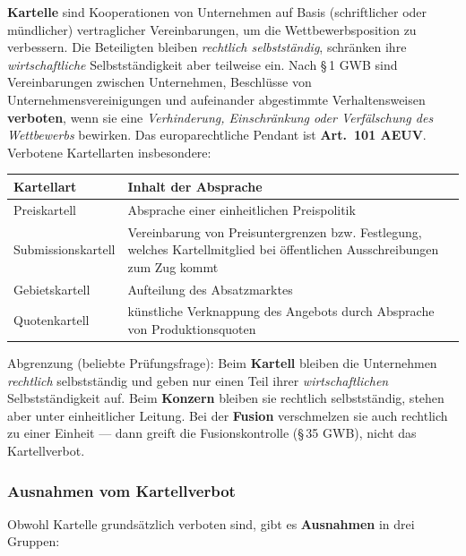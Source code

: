 \documentclass[11pt, a4paper]{article}
\begin{document}
\textbf{Kartelle} sind Kooperationen von Unternehmen auf Basis (schriftlicher oder
mündlicher) vertraglicher Vereinbarungen, um die Wettbewerbsposition zu verbessern. Die
Beteiligten bleiben \emph{rechtlich selbstständig}, schränken ihre \emph{wirtschaftliche}
Selbstständigkeit aber teilweise ein. Nach \S\,1 GWB sind Vereinbarungen zwischen
Unternehmen, Beschlüsse von Unternehmensvereinigungen und aufeinander abgestimmte
Verhaltensweisen \textbf{verboten}, wenn sie eine \emph{Verhinderung, Einschränkung oder
Verfälschung des Wettbewerbs} bewirken. Das europarechtliche Pendant ist
\textbf{Art.~101 AEUV}. Verbotene Kartellarten insbesondere:

\begin{center}
\begin{tabular}{p{4.2cm} p{9.8cm}}
\toprule
\textbf{Kartellart} & \textbf{Inhalt der Absprache}\\
\midrule
Preiskartell & Absprache einer einheitlichen Preispolitik\\
Submissionskartell & Vereinbarung von Preisuntergrenzen bzw. Festlegung, welches Kartellmitglied bei öffentlichen Ausschreibungen zum Zug kommt\\
Gebietskartell & Aufteilung des Absatzmarktes\\
Quotenkartell & künstliche Verknappung des Angebots durch Absprache von Produktionsquoten\\
\bottomrule
\end{tabular}
\end{center}

\begin{achtung}
Abgrenzung (beliebte Prüfungsfrage): Beim \textbf{Kartell} bleiben die Unternehmen
\emph{rechtlich} selbstständig und geben nur einen Teil ihrer \emph{wirtschaftlichen}
Selbstständigkeit auf. Beim \textbf{Konzern} bleiben sie rechtlich selbstständig, stehen
aber unter einheitlicher Leitung. Bei der \textbf{Fusion} verschmelzen sie auch
rechtlich zu einer Einheit --- dann greift die Fusionskontrolle (\S\,35 GWB), nicht das
Kartellverbot.
\end{achtung}

\subsubsection{Ausnahmen vom Kartellverbot}

Obwohl Kartelle grundsätzlich verboten sind, gibt es \textbf{Ausnahmen} in drei Gruppen:
\end{document}
